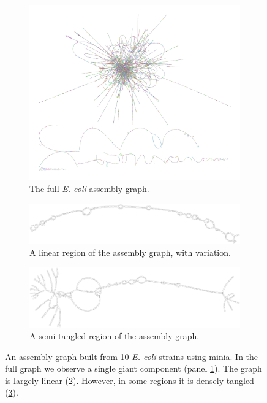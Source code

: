 \begin{figure}[htbp!]
  \centering
  \begin{subfigure}[t]{1.0\textwidth}
    \includegraphics[width=1.0\textwidth]{Chapter3/Figs/ecoli_10strain_kmer51abund10_contigs_vg_gfa.png}
    \caption{The full \emph{E. coli} assembly graph.}
    \label{subfig:ecoli_pangenome_bandage}
  \end{subfigure}
  \begin{subfigure}[t]{0.7\textwidth}
    \includegraphics[width=1.0\textwidth]{Chapter3/Figs/ecoli_n298051_c100.pdf}
    \caption{A linear region of the assembly graph, with variation.}
    \label{subfig:ecoli_pangenome_linear}
  \end{subfigure}
  \begin{subfigure}[t]{0.7\textwidth}
    \includegraphics[width=1.0\textwidth]{Chapter3/Figs/ecoli_n213909_c100.pdf}
    \caption{A semi-tangled region of the assembly graph.}
    \label{subfig:ecoli_pangenome_tangle}
  \end{subfigure}
  \caption[An \emph{E. coli} pangenome]{
    An assembly graph built from 10 \emph{E. coli} strains using minia.
    In the full graph we observe a single giant component (panel \ref{subfig:ecoli_pangenome_bandage}).
    The graph is largely linear (\ref{subfig:ecoli_pangenome_linear}).
    However, in some regions it is densely tangled (\ref{subfig:ecoli_pangenome_tangle}).
  }
  \label{fig:ecoli_pangenome}
\end{figure}


